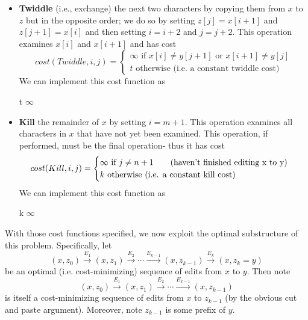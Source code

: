 \documentclass[paper=a4, fontsize=11pt]{scrartcl} %
\numberwithin{equation}{section} %
\numberwithin{figure}{section} %
\numberwithin{table}{section} %
\begin{document}
\begin{itemize}
\item \textbf{Twiddle} (i.e., exchange) the next two characters by copying them from $x$ to $z$ but in the opposite order; we do so by setting $z[j] = x[i+1]$ and $z[j+1] = x[i]$ and then setting $i = i +2$ and $j = j + 2$. This operation examines $x[i]$ and $x[i+1]$ and has cost
\[
cost(Twiddle, i, j) = 
\begin{cases}
\infty \textrm{ if } x[i] \ne y[j+1] \textrm{ or } x[i+1] \ne y[j]\\
t \textrm{ otherwise (i.e. a constant twiddle cost)}
\end{cases}
\]
We can implement this cost function as\\
\begin{algorithmic}
	\State \Return t
\Else
	\State \Return $\infty$
\EndIf
\EndFunction
\end{algorithmic}

\item \textbf{Kill} the remainder of $x$ by setting $i = m + 1$. This operation examines all characters in $x$ that have not yet been examined. This operation, if performed, must be the final operation- thus it has cost
\[
cost(Kill, i, j) = 
\begin{cases}
\infty \textrm{ if } j \ne n + 1 \qquad{} \textrm{(haven't finished editing }$x$\textrm{ to }$y$)\\
k \textrm{ otherwise (i.e. a constant kill cost)}
\end{cases}
\]
We can implement this cost function as\\
\begin{algorithmic}
	\State \Return k
\Else
	\State \Return $\infty$
\EndIf
\EndFunction
\end{algorithmic}
\end{itemize}

With those cost functions specified, we now exploit the optimal substructure of this problem. Specifically, let
\[(x, z_0) \stackrel{E_1}{\rightarrow} (x, z_1) \stackrel{E_2}{\rightarrow} \cdots \stackrel{E_{k-1}}{\rightarrow} (x, z_{k-1})\stackrel{E_k}{\rightarrow} (x, z_k = y) \]
be an optimal (i.e. cost-minimizing) sequence of edits from $x$ to $y$. Then note
\[(x, z_0) \stackrel{E_1}{\rightarrow} (x, z_1) \stackrel{E_2}{\rightarrow} \cdots \stackrel{E_{k-1}}{\rightarrow} (x, z_{k-1})\]
is itself a cost-minimizing sequence of edits from $x$ to $z_{k-1}$ (by the obvious cut and paste argument). Moreover, note $z_{k-1}$ is some prefix of $y$. \\
\end{document}
